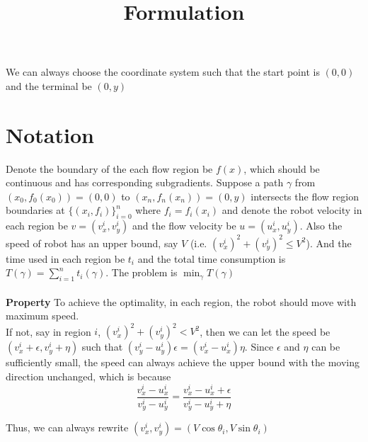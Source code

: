 \documentclass{article}
\title{Formulation}
\author{}
\date{}
\begin{document}
\maketitle

We can always choose the coordinate system such that the start point is $(0,0)$ and the terminal be $(0,y)$
\section{Notation}
Denote the boundary of the each flow region be $f(x)$, which should be continuous and has corresponding subgradients.
Suppose a path $\gamma$ from $(x_0,f_0(x_0))=(0,0)$ to $(x_n,f_n(x_n))=(0,y)$ intersects the flow region boundaries at $\{(x_i,f_i)\}_{i=0}^n$ where $f_i=f_i(x_i)$ and denote the robot velocity in each region be $v=(v_x^i,v_y^i)$ and the flow velocity be $u=(u_x^i,u_y^i)$. Also the speed of robot has an upper bound, say $V$ (i.e. $(v_x^i)^2+(v_y^i)^2\leq V^2$). And the time used in each region be $t_i$ and the total time consumption is $T(\gamma)=\sum_{i=1}^nt_i(\gamma)$. The problem is $\min_{\gamma} T(\gamma)$\\\\
\textbf{Property} To achieve the optimality, in each region, the robot should move with maximum speed.\\
If not, say in region $i$, $(v_x^i)^2+(v_y^i)^2<V^2$, then we can let the speed be $(v_x^i+\epsilon,v_y^i+\eta)$ such that $(v_y^i-u_y^i)\epsilon=(v_x^i-u_x^i)\eta$. Since $\epsilon$ and $\eta$ can be sufficiently small, the speed can always achieve the upper bound with the moving direction unchanged, which is because
\[
\frac{v_x^i-u_x^i}{v_y^i-u_y^i}=\frac{v_x^i-u_x^i+\epsilon}{v_y^i-u_y^i+\eta}
\]

Thus, we can always rewrite $(v_x^i,v_y^i)=(V\cos\theta_i,V\sin\theta_i)$
\end{document}
